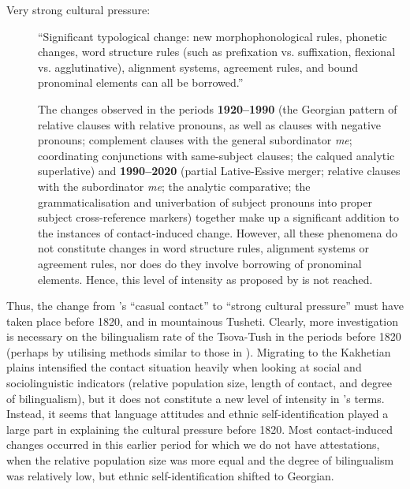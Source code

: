 \begin{description}
	\item [Very strong cultural pressure:] ``Significant typological change: new morphophonological rules, phonetic changes, word structure rules (such as prefixation vs. suffixation, flexional vs. agglutinative), alignment systems, agreement rules, and bound pronominal elements can all be borrowed.'' 
	
	The changes observed in the periods \textbf{1920--1990} (the Georgian pattern of relative clauses with relative pronouns, as well as clauses with negative pronouns; complement clauses with the general subordinator \textit{me}; coordinating conjunctions with same-subject clauses; the calqued analytic superlative) and \textbf{1990--2020} (partial Lative-Essive merger; relative clauses with the subordinator \textit{me}; the analytic comparative; the grammaticalisation and univerbation of subject pronouns into proper subject cross\hyp reference markers) together make up a significant addition to the instances of contact\hyp induced change. However, all these phenomena do not constitute changes in word structure rules, alignment systems or agreement rules, nor does do they involve borrowing of pronominal elements. Hence, this level of intensity as proposed by \textcite{thomasonkaufman1988} is not reached.
\end{description}

Thus, the change from \citeauthor{thomasonkaufman1988}'s “casual contact” to “strong cultural pressure” must have taken place before 1820, and in mountainous Tusheti. Clearly, more investigation is necessary on the bilingualism rate of the Tsova-Tush in the periods before 1820 (perhaps by utilising methods similar to those in \cite{dobrushina2013multipast}). Migrating to the Kakhetian plains intensified the contact situation heavily when looking at social and sociolinguistic indicators (relative population size, length of contact, and degree of bilingualism), but it does not constitute a new level of intensity in \citeauthor{thomasonkaufman1988}'s terms. Instead, it seems that language attitudes and ethnic self\hyp identification played a large part in explaining the cultural pressure before 1820. Most contact-induced changes occurred in this earlier period for which we do not have attestations, when the relative population size was more equal and the degree of bilingualism was relatively low, but ethnic self-identification shifted to Georgian.
